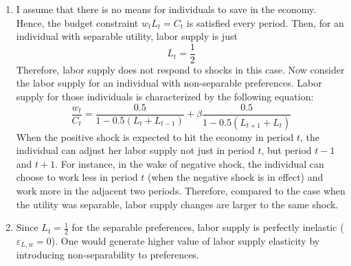 \documentclass[11pt]{amsart}
\begin{document}
\begin{enumerate}[label=(\alph*)]
	\item I assume that there is no means for individuals to save in the economy. Hence, the budget constraint $w_t L_t = C_t$ is satisfied every period. Then, for an individual with separable utility, labor supply is just 
	\begin{equation*}
	L_t = \frac{1}{2}
	\end{equation*}
	Therefore, labor supply does not respond to shocks in this case. Now consider the labor supply for an individual with non-separable preferences. Labor supply for those individuals is characterized by the following equation:
	\begin{equation*}
	\frac{w_t}{C_t}  = \frac{0.5}{1 - 0.5 \left( L_t + L_{t-1} \right)} + \beta \frac{0.5}{1 - 0.5 \left( L_{t+1} + L_t \right)}
	\end{equation*}
	When the positive shock is expected to hit the economy in period $t$, the individual can adjust her labor supply not just in period $t$, but period $t-1$ and $t+1$. For instance, in the wake of negative shock, the individual can choose to work less in period $t$ (when the negative shock is in effect) and work more in the adjacent two periods. Therefore, compared to the case when the utility was separable, labor supply changes are larger to the same shock. 
	
	\item Since $L_t = \frac{1}{2}$ for the separable preferences, labor supply is perfectly inelastic ($\varepsilon_{L,w} = 0$). One would generate higher value of labor supply elasticity by introducing non-separability to preferences. 
\end{enumerate}
\end{document}
